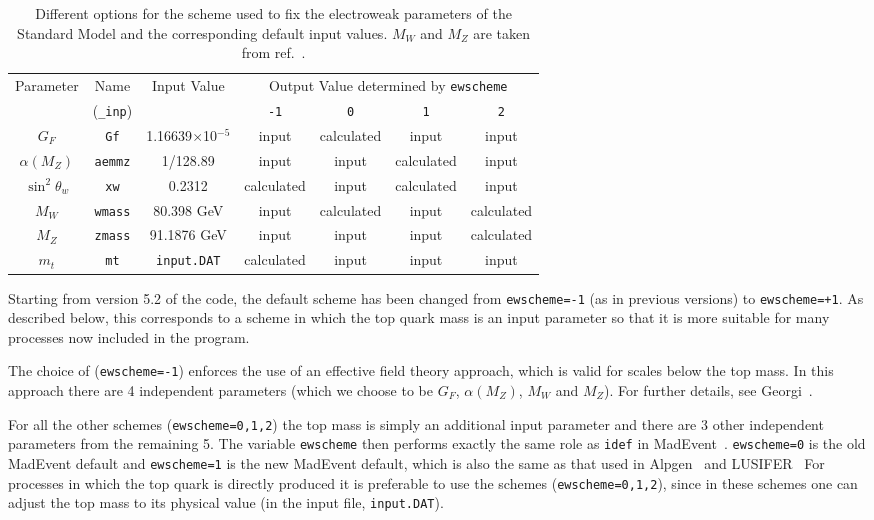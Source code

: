 \documentclass[12pt]{article}
\begin{document}
\begin{table}
\begin{center}
\begin{tabular}{|c|c|c|c|c|c|c|} \hline
 Parameter & Name & Input Value
 & \multicolumn{4}{c|}{Output Value determined by \tt ewscheme} \\
\cline{4-7}
& ({\tt \_inp}) & & {\tt -1} & {\tt 0} & {\tt 1} & {\tt 2} \\ \hline
$G_F$            & {\tt Gf}      & 1.16639$\times$10$^{-5}$ 
 & input & calculated & input & input \\
$\alpha(M_Z)$    & {\tt aemmz}   & 1/128.89                 
 & input & input & calculated & input \\
$\sin^2 \theta_w$& {\tt xw}      & 0.2312               
 & calculated & input & calculated & input \\
$M_W$            & {\tt wmass}   & 80.398 GeV                
 & input & calculated & input & calculated \\
$M_Z$            & {\tt zmass}   & 91.1876 GeV               
 & input & input & input & calculated \\
$m_t$            & {\tt mt}      & {\tt input.DAT}                  
 & calculated & input & input & input \\
\hline
\end{tabular}
\caption{Different options for the scheme used to fix the electroweak
parameters of the Standard Model and the corresponding default input
values. $M_W$ and $M_Z$ are taken from ref.~\cite{Amsler:2008zzb}.}
\label{ewscheme}
\end{center}
\end{table}

Starting from version 5.2 of the code, the default scheme has been
changed from {\tt ewscheme=-1} (as in previous versions) to
{\tt ewscheme=+1}. As described below, this corresponds to a scheme
in which the top quark mass is an input parameter so that it is
more suitable for many processes now included in the program.

The choice of ({\tt ewscheme=-1}) enforces the use of an effective field
theory approach, which is valid for scales below the top mass. In this
approach there are 4 independent parameters (which we choose to be
$G_F$, $\alpha(M_Z)$, $M_W$ and $M_Z$). For further details,
see Georgi~\cite{Georgi:1991ci}.

For all the other schemes ({\tt ewscheme=0,1,2}) the top mass is simply
an additional input parameter and there are 3 other independent
parameters from the remaining 5. The variable {\tt ewscheme} then performs
exactly the same role as {\tt idef} in MadEvent~\cite{Maltoni:2002qb}.
{\tt ewscheme=0} is the old MadEvent default and {\tt ewscheme=1} is the
new MadEvent default, which is also the same as that used in 
Alpgen~\cite{Alpgen} and LUSIFER~\cite{Lusifer} 
For processes in which the top quark is directly produced  it is 
preferable to use  the schemes ({\tt ewscheme=0,1,2}), since in these schemes
one can adjust the top mass to its physical value (in the input file,
{\tt input.DAT}).
\end{document}
